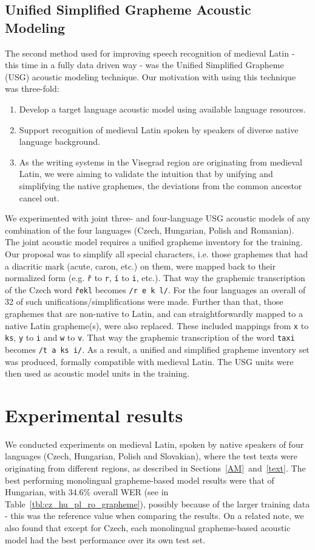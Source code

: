 \documentclass[runningheads,a4paper]{llncs}
\begin{document}
\subsection{Unified Simplified Grapheme Acoustic Modeling}\label{usg}
The second method used for improving speech recognition of medieval Latin - this time in a fully data driven way - was the Unified Simplified Grapheme (USG) acoustic modeling technique.
Our motivation with using this technique was three-fold:
\begin{enumerate}
\item Develop a target language acoustic model using available language resources.
\item Support recognition of medieval Latin spoken by speakers of diverse native language background.
\item As the writing systems in the Visegrad region are originating from medieval Latin, we were aiming to validate the intuition that by unifying and simplifying the native graphemes, the deviations from the common ancestor cancel out.
\end{enumerate}
We experimented with joint three- and four-language USG acoustic models of any combination of the four languages (Czech, Hungarian, Polish and Romanian). 
The joint acoustic model requires a unified grapheme inventory for the training.
Our proposal was to simplify all special characters, i.e. those graphemes that had a diacritic mark (acute, caron, etc.) on them, were mapped back to their normalized form (e.g. \texttt{\v{r}} to \texttt{r}, \texttt{\'{i}} to \texttt{i}, etc.).
That way the graphemic transcription of the Czech word \texttt{\v{r}ekl} becomes \texttt{/r~e~k~l/}.
For the four languages an overall of 32 of such unifications/simplifications were made.
Further than that, those graphemes that are non-native to Latin, and can straightforwardly mapped to a native Latin grapheme(s), were also replaced.
These included mappings from \texttt{x} to \texttt{ks}, \texttt{y} to \texttt{i} and \texttt{w} to \texttt{v}.
That way the graphemic transcription of the word \texttt{taxi} becomes \texttt{/t~a~ks~i/}.
As a result, a unified and simplified grapheme inventory set was produced, formally compatible with medieval Latin.
The USG units were then used as acoustic model units in the training.

\section{Experimental results}\label{results}
We conducted experiments on medieval Latin, spoken by native speakers of four languages (Czech, Hungarian, Polish and Slovakian), where the test texts were originating from different regions, as described in Sections~\ref{AM}~and~\ref{text}.
The best performing monolingual grapheme-based model results were that of Hungarian, with $34.6\%$ overall WER (see in Table~\ref{tbl:cz_hu_pl_ro_grapheme}), possibly because of the larger training data - this was the reference value when comparing the results.
On a related note, we also found that except for Czech, each monolingual grapheme-based acoustic model had the best performance over its own test set.
\end{document}
